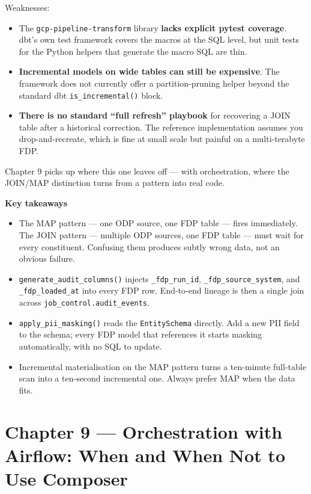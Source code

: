 \documentclass[
  11pt,
  british,
  oneside]{book}
\providecommand{\tightlist}{%
  \setlength{\itemsep}{0pt}\setlength{\parskip}{0pt}}
\begin{document}
Weaknesses:

\begin{itemize}
\tightlist
\item
  The \texttt{gcp-pipeline-transform} library \textbf{lacks explicit
  pytest coverage}. dbt's own test framework covers the macros at the
  SQL level, but unit tests for the Python helpers that generate the
  macro SQL are thin.
\item
  \textbf{Incremental models on wide tables can still be expensive}. The
  framework does not currently offer a partition-pruning helper beyond
  the standard dbt \texttt{is\_incremental()} block.
\item
  \textbf{There is no standard ``full refresh'' playbook} for recovering
  a JOIN table after a historical correction. The reference
  implementation assumes you drop-and-recreate, which is fine at small
  scale but painful on a multi-terabyte FDP.
\end{itemize}

Chapter 9 picks up where this one leaves off --- with orchestration,
where the JOIN/MAP distinction turns from a pattern into real code.

\begin{takeaways}
\textbf{Key takeaways}
\begin{itemize}
  \item The MAP pattern — one ODP source, one FDP table — fires immediately. The JOIN pattern — multiple ODP sources, one FDP table — must wait for every constituent. Confusing them produces subtly wrong data, not an obvious failure.
  \item \texttt{generate\_audit\_columns()} injects \texttt{\_fdp\_run\_id}, \texttt{\_fdp\_source\_system}, and \texttt{\_fdp\_loaded\_at} into every FDP row. End-to-end lineage is then a single join across \texttt{job\_control.audit\_events}.
  \item \texttt{apply\_pii\_masking()} reads the \texttt{EntitySchema} directly. Add a new PII field to the schema; every FDP model that references it starts masking automatically, with no SQL to update.
  \item Incremental materialisation on the MAP pattern turns a ten-minute full-table scan into a ten-second incremental one. Always prefer MAP when the data fits.
\end{itemize}
\end{takeaways}

\newpage

\hypertarget{chapter-9-orchestration-with-airflow-when-and-when-not-to-use-composer}{%
\chapter{Chapter 9 --- Orchestration with Airflow: When and When Not to
Use
Composer}\label{chapter-9-orchestration-with-airflow-when-and-when-not-to-use-composer}}
\end{document}
